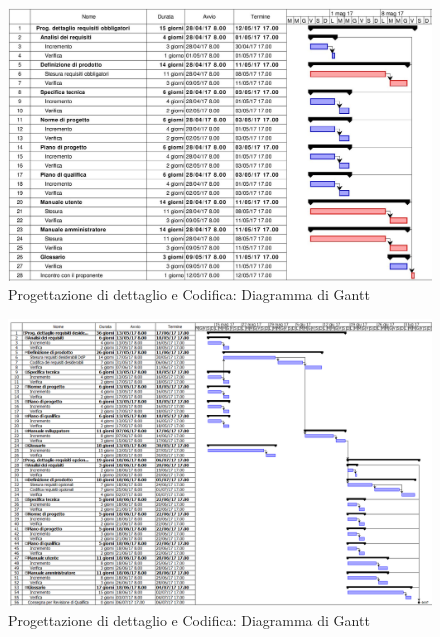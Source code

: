 \documentclass[../PianoDiProgetto.tex]{subfiles}
\begin{document}
		\begin{figure}[H]
			\centering
			\includegraphics[scale=0.55]{Figures/Gantt_DettaglioObbligatori}
			\caption{Progettazione di dettaglio e Codifica: Diagramma di Gantt}
		\end{figure}
		\begin{figure}[H]
			\centering
			\includegraphics[scale=0.7]{Figures/Gantt_DettaglioOpz}
			\caption{Progettazione di dettaglio e Codifica: Diagramma di Gantt}
		\end{figure}
	
	
		
\end{document}
